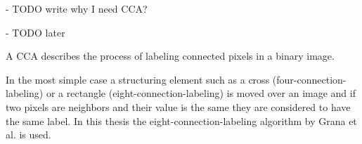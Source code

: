 - TODO write why I need CCA?

- TODO later

A \ac{CCA} describes the process of labeling connected pixels in a binary image.

In the most simple case a structuring element such as a cross (four-connection-labeling) or a rectangle (eight-connection-labeling) is moved over an image and if two pixels are neighbors and their value is the same they are considered to have the same label. In this thesis the eight-connection-labeling algorithm by Grana et al. \cite{cca} is used.
